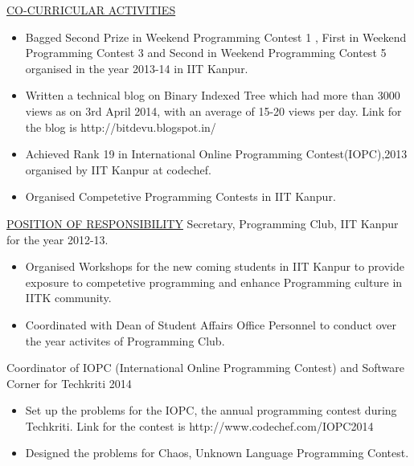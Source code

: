 \documentclass[10pt]{res}
\begin{document}
\begin{resume}
\begin{section}{\underline{CO-CURRICULAR ACTIVITIES}}
\begin{itemize}
\item{
Bagged Second Prize in Weekend Programming Contest 1 , First in Weekend Programming Contest 3 and Second in Weekend Programming Contest 5 organised in the year 2013-14 in IIT Kanpur.
}
\item{
Written a technical blog on Binary Indexed Tree which had more than 3000 views as on 3rd April 2014, with an average of 15-20 views per day. Link for the blog is http://bitdevu.blogspot.in/
}
\item{
Achieved Rank 19 in International Online Programming Contest(IOPC),2013 organised by IIT Kanpur at codechef.
}
\item{
Organised Competetive Programming Contests in IIT Kanpur.
}
\end{itemize}
\end{section}
\begin{section}{\underline{POSITION OF RESPONSIBILITY}}
\vspace{.2in}
Secretary, Programming Club, IIT Kanpur for the year 2012-13.
\vspace{.1in}
\begin{itemize}
\item{
Organised Workshops for the new coming students in IIT Kanpur to provide exposure to competetive programming and enhance Programming culture in IITK community.
}
\item{
Coordinated with Dean of Student Affairs Office Personnel to conduct over the year activites of Programming Club.
}
\end{itemize}
Coordinator of IOPC (International Online Programming Contest) and Software Corner for Techkriti 2014
\vspace{.1in}
\begin{itemize}
\item{
Set up the problems for the IOPC, the annual programming contest during Techkriti. Link for the contest is http://www.codechef.com/IOPC2014
}
\item{
Designed the problems for Chaos, Unknown Language Programming Contest.
}
\end{itemize}
\end{section}
\end{resume} 
\end{document}
